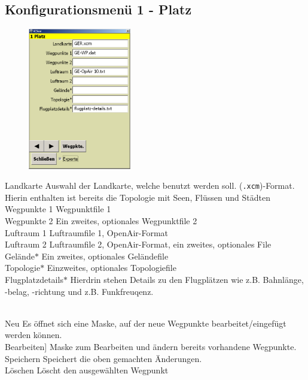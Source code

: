 \subsection{Konfigurationsmenü 1 - Platz}\label{Konfig1}
\begin{figure}
\includegraphics[width=4.5cm]{Bilder/Konfig1Platz.png}
\end{figure}
\textsf{Landkarte} Auswahl der Landkarte, welche benutzt werden soll. (\texttt{.xcm})-Format. Hierin enthalten ist bereits die Topologie mit Seen, Flüssen und Städten\\[0.5em]
\textsf{Wegpunkte 1} Wegpunktfile 1\\[0.5em]
\textsf{Wegpunkte 2} Ein zweites, optionales Wegpunktfile 2\\[0.5em]
\textsf{Luftraum 1} Luftraumfile 1, OpenAir-Format\\[0.5em]
\textsf{Luftraum 2} Luftraumfile 2, OpenAir-Format, ein zweites, optionales File\\[0.5em]
\textsf{Gelände$\ast$} Ein zweites, optionales  Geländefile \\[0.5em]
\textsf{Topologie$\ast$} Einzweites, optionales Topologiefile\\[0.5em]
\textsf{Flugplatzdetails$\ast$} Hierdrin stehen Details zu den Flugplätzen wie z.B. Bahnlänge, -belag, -richtung und z.B. Funkfreuqenz.


\\[0.5em]
\textsf{Neu} Es öffnet sich eine Maske, auf der neue Wegpunkte bearbeitet/eingefügt werden können.\\[0.5em]
\textsf{Bearbeiten}] Maske zum Bearbeiten und ändern bereits vorhandene Wegpunkte.\\[0.5em]
\textsf{Speichern} Speichert die oben gemachten Änderungen.\\[0.5em]
\textsf{Löschen} Löscht den ausgewählten Wegpunkt

